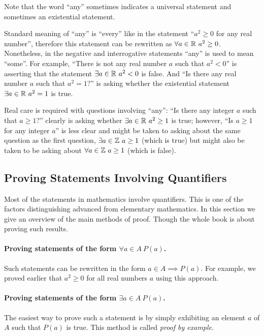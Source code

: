 \begin{warning}
    Note that the word ``any'' sometimes indicates a universal statement and
    sometimes an existential statement.

    Standard meaning of ``any'' is ``every'' like in the statement ``$a^2 \ge 0$
    for any real number'', therefore this statement can be rewritten as
    $\forall a \in \mathbb{R} \ a^2 \ge 0$. Nonetheless, in the negative and interrogative
    statements ``any'' is used to mean ``some''. For example, ``There is not any
    real number $a$ such that $a^2 < 0$'' is asserting that the statement
    $\exists a \in \mathbb{R} \ a^2 < 0$ is false. And ``Is there any real number $a$ such
    that $a^2 = 1$?'' is asking whether the existential statement
    $\exists a \in \mathbb{R} \ a^2 = 1$ is true.

    Real care is required with questions involving ``any'': ``Is there any
    integer $a$ such that $a \ge 1$?'' clearly is asking whether $\exists a \in
    \mathbb{R} \ a^2 \ge 1$ is true; however, ``Is $a \ge 1$ for any integer $a$'' is less
    clear and might be taken to asking about the same question as the first
    question, $\exists a \in \mathbb{Z} \ a \ge 1$ (which is true) but might also be
    taken to be asking about $\forall a \in \mathbb{Z} \ a \ge 1$ (which is false).
\end{warning}

\subsection{Proving Statements Involving Quantifiers}
Most of the statements in mathematics involve quantifiers. This is one of the
factors distinguishing advanced from elementary mathematics. In this section we
give an overview of the main methods of proof. Though the whole book is about
proving such results.

\paragraph{Proving statements of the form $\forall a \in A \ P(a)$.}
Such statements can be rewritten in the form $a \in A \implies P(a)$. For
example, we proved earlier that $a^2 \ge 0$ for all real numbers $a$ using this
approach.

\paragraph{Proving statements of the form $\exists a \in A \ P(a)$.}
The easiest way to prove such a statement is by simply exhibiting an element $a$
of $A$ such that $P(a)$ is true. This method is called \emph{proof by
example}.

